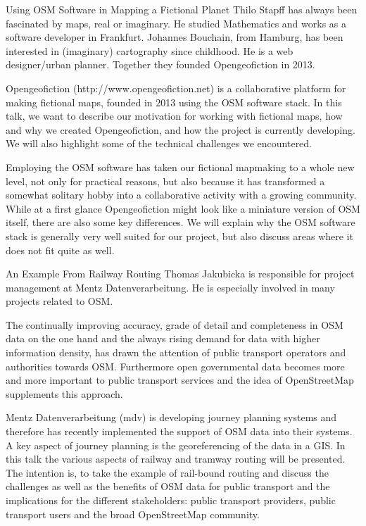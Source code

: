 %
{Using OSM Software in Mapping a Fictional Planet}%
{Thilo Stapff has always been fascinated by maps, real or imaginary. 
He studied Mathematics and works as a software developer in Frankfurt. Johannes Bouchain, from Hamburg, has been interested in (imaginary) cartography since childhood. He is a web designer/urban planner. Together they founded Opengeofiction in 2013.  }%
{Opengeofiction (http://www.opengeofiction.net) is a collaborative platform for making fictional maps, founded in 2013 using the OSM software stack. In this talk, we want to describe our motivation for working with fictional maps, how and why we created Opengeofiction, and how the project is currently developing. We will also highlight some of the technical challenges we encountered.

Employing the OSM software has taken our fictional mapmaking to a whole new level, not only for practical reasons, but also because it has transformed a somewhat solitary hobby into a collaborative activity with a growing community. While at a first glance Opengeofiction might look like a miniature version of OSM itself, there are also some key differences. We will explain why the OSM software stack is generally very well suited for our project, but also discuss areas where it does not fit quite as well.
}

%
{An Example From Railway Routing}%
{Thomas Jakubicka is responsible for project management at Mentz Datenverarbeitung. He is especially involved in many projects related to OSM.}%
{The continually improving accuracy, grade of detail and completeness in OSM data on the one hand and the always rising demand for data with higher information density, has drawn the attention of public transport operators and authorities towards OSM. Furthermore open governmental data becomes more and more important to public transport services and the idea of OpenStreetMap supplements this approach.

Mentz Datenverarbeitung (mdv) is developing journey planning systems and therefore has recently implement\-ed the support of OSM data into their systems. A key aspect of journey planning is the georeferencing of the data in a GIS. In this talk the various aspects of railway and tramway routing will be presented. The intention is, to take the example of rail-bound routing and discuss the challenges as well as the benefits of OSM data for public transport and the implications for the different stakeholders: public transport providers, public transport users and the broad OpenStreetMap community.}



